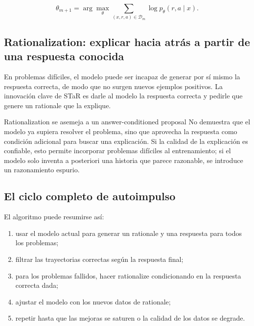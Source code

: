 \documentclass[a4paper]{article}
\begin{document}
$$
\theta_{m+1}=\arg\max_\theta
\sum_{(x,r,a)\in\mathcal D_m}\log p_\theta(r,a\mid x).
$$

\subsection{Rationalization: explicar hacia atrás a partir de una respuesta conocida}

En problemas difíciles, el modelo puede ser incapaz de generar por sí mismo la respuesta correcta, de modo que no surgen nuevos ejemplos positivos. La innovación clave de STaR es darle al modelo la respuesta correcta y pedirle que genere un rationale que la explique.


\begin{knowledgebox}{Rationalization se asemeja a un answer-conditioned proposal}
No demuestra que el modelo ya supiera resolver el problema, sino que aprovecha la respuesta como condición adicional para buscar una explicación. Si la calidad de la explicación es confiable, esto permite incorporar problemas difíciles al entrenamiento; si el modelo solo inventa a posteriori una historia que parece razonable, se introduce un razonamiento espurio.
\end{knowledgebox}

\subsection{El ciclo completo de autoimpulso}



El algoritmo puede resumirse así:

\begin{enumerate}
    \item usar el modelo actual para generar un rationale y una respuesta para todos los problemas;
    \item filtrar las trayectorias correctas según la respuesta final;
    \item para los problemas fallidos, hacer rationalize condicionando en la respuesta correcta dada;
    \item ajustar el modelo con los nuevos datos de rationale;
    \item repetir hasta que las mejoras se saturen o la calidad de los datos se degrade.
\end{enumerate}
\end{document}
